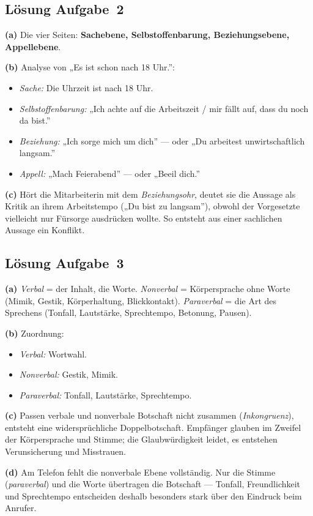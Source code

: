 \documentclass[11pt, a4paper]{article}
\begin{document}
\subsection*{Lösung Aufgabe~2}
\begin{loesung}
\textbf{(a)} Die vier Seiten: \textbf{Sachebene, Selbstoffenbarung, Beziehungsebene,
Appellebene}.

\textbf{(b)} Analyse von „Es ist schon nach 18 Uhr.”:
\begin{itemize}[itemsep=0pt]
  \item \emph{Sache:} Die Uhrzeit ist nach 18 Uhr.
  \item \emph{Selbstoffenbarung:} „Ich achte auf die Arbeitszeit / mir fällt auf, dass du
    noch da bist.”
  \item \emph{Beziehung:} „Ich sorge mich um dich” --- oder „Du arbeitest unwirtschaftlich
    langsam.”
  \item \emph{Appell:} „Mach Feierabend” --- oder „Beeil dich.”
\end{itemize}

\textbf{(c)} Hört die Mitarbeiterin mit dem \emph{Beziehungsohr}, deutet sie die Aussage
als Kritik an ihrem Arbeitstempo („Du bist zu langsam”), obwohl der Vorgesetzte vielleicht
nur Fürsorge ausdrücken wollte. So entsteht aus einer sachlichen Aussage ein Konflikt.
\end{loesung}

\subsection*{Lösung Aufgabe~3}
\begin{loesung}
\textbf{(a)} \emph{Verbal} = der Inhalt, die Worte. \emph{Nonverbal} = Körpersprache ohne
Worte (Mimik, Gestik, Körperhaltung, Blickkontakt). \emph{Paraverbal} = die Art des
Sprechens (Tonfall, Lautstärke, Sprechtempo, Betonung, Pausen).

\textbf{(b)} Zuordnung:
\begin{itemize}[itemsep=0pt]
  \item \emph{Verbal:} Wortwahl.
  \item \emph{Nonverbal:} Gestik, Mimik.
  \item \emph{Paraverbal:} Tonfall, Lautstärke, Sprechtempo.
\end{itemize}

\textbf{(c)} Passen verbale und nonverbale Botschaft nicht zusammen (\emph{Inkongruenz}),
entsteht eine widersprüchliche Doppelbotschaft. Empfänger glauben im Zweifel der
Körpersprache und Stimme; die Glaubwürdigkeit leidet, es entstehen Verunsicherung und
Misstrauen.

\textbf{(d)} Am Telefon fehlt die nonverbale Ebene vollständig. Nur die Stimme
(\emph{paraverbal}) und die Worte übertragen die Botschaft --- Tonfall, Freundlichkeit und
Sprechtempo entscheiden deshalb besonders stark über den Eindruck beim Anrufer.
\end{loesung}
\end{document}
